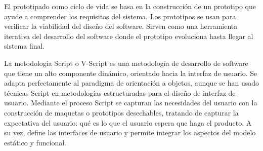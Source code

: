 El prototipado como ciclo de vida se basa en la construcción de un prototipo que ayude a comprender los requisitos del sistema. Los prototipos se usan para verificar la viabilidad del diseño del software. Sirven como una herramienta iterativa del desarrollo del software donde el prototipo evoluciona hasta llegar al sistema final. 

La metodología Script o V-Script es una metodología de desarrollo de software que tiene un alto componente dinámico, orientado hacia la interfaz de usuario. Se adapta perfectamente al paradigma de orientación a objetos, aunque se han usado técnicas Script en metodologías estructuradas para el diseño de interfaz de usuario.
Mediante el proceso Script se capturan las necesidades del usuario con la construcción de maquetas o prototipos desechables, tratando de capturar la expectativa del usuario: qué es lo que el usuario espera que haga el producto. A su vez, define las interfaces de usuario y permite integrar los aspectos del modelo estático y funcional.
